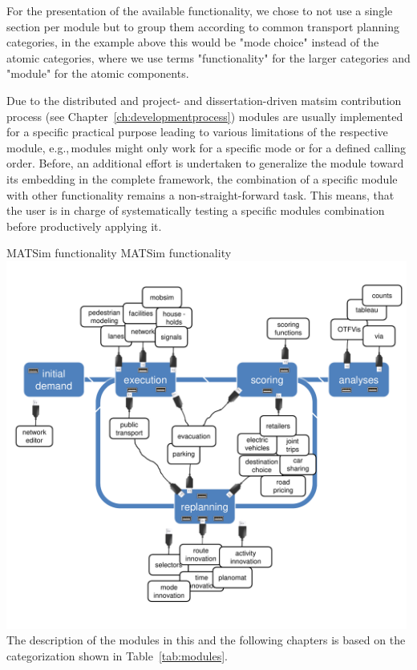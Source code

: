 For the presentation of the available functionality, we chose to not use a single section per module but to group them according to common transport planning categories, in the example above this would be "mode choice" instead of the atomic categories, where we use terms "functionality" for the larger categories and "module" for the atomic components. %

Due to the distributed and project- and dissertation-driven \gls{matsim} contribution process (see Chapter~\ref{ch:developmentprocess}) modules are usually implemented for a specific practical purpose leading to various limitations of the respective module, e.g.,\,modules might only work for a specific mode or for a defined calling order. Before, an additional effort is undertaken to generalize the module toward its embedding in the complete framework, the combination of a specific module with other functionality remains a non-straight-forward task. This means, that the user is in charge of systematically testing a specific modules combination before productively applying it.

\createfigure%
{MATSim functionality}%
{MATSim functionality}%
{\label{fig:matsimmodules}}%
{\includegraphics[width=0.99\textwidth, angle=0]{extending/figures/modules.pdf}}%
{}
%
The description of the modules in this and the following chapters is based on the categorization shown in Table~\ref{tab:modules}.
%

